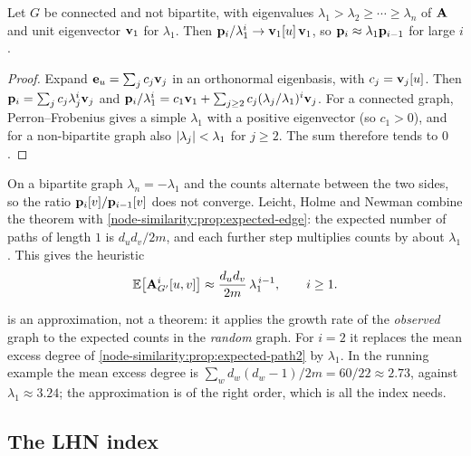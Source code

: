 \begin{notechapter}
\begin{theorem}\label{node-similarity:thm:path-growth}
Let $G$ be connected and not bipartite, with eigenvalues $\lambda_1 > \lambda_2 \ge \cdots \ge \lambda_n$ of $\mathbf{A}$ and unit eigenvector $\mathbf{v}_1$ for $\lambda_1$. Then $\mathbf{p}_i/\lambda_1^i \to \mathbf{v}_1[u]\,\mathbf{v}_1$, so $\mathbf{p}_i \approx \lambda_1\mathbf{p}_{i-1}$ for large $i$.
\end{theorem}

\begin{proof}
Expand $\mathbf{e}_u = \sum_j c_j\mathbf{v}_j$ in an orthonormal eigenbasis, with $c_j = \mathbf{v}_j[u]$. Then $\mathbf{p}_i = \sum_j c_j\lambda_j^i\mathbf{v}_j$ and $\mathbf{p}_i/\lambda_1^i = c_1\mathbf{v}_1 + \sum_{j\ge2}c_j(\lambda_j/\lambda_1)^i\mathbf{v}_j$. For a connected graph, Perron--Frobenius gives a simple $\lambda_1$ with a positive eigenvector (so $c_1 > 0$), and for a non-bipartite graph also $\left|\lambda_j\right| < \lambda_1$ for $j \ge 2$. The sum therefore tends to $0$.
\end{proof}

On a bipartite graph $\lambda_n = -\lambda_1$ and the counts alternate between the two sides, so the ratio $\mathbf{p}_i[v]/\mathbf{p}_{i-1}[v]$ does not converge. Leicht, Holme and Newman combine the theorem with \cref{node-similarity:prop:expected-edge}: the expected number of paths of length $1$ is $d_ud_v/2m$, and each further step multiplies counts by about $\lambda_1$. This gives the heuristic
\begin{equation}
\mathbb{E}\bigl[\mathbf{A}_{G'}^i[u,v]\bigr] \approx \frac{d_u d_v}{2m}\,\lambda_1^{\,i-1}, \qquad i \ge 1 .
\label{node-similarity:eq:expected-path-approx}
\end{equation}

\begin{remark}
 is an approximation, not a theorem: it applies the growth rate of the \emph{observed} graph to the expected counts in the \emph{random} graph. For $i = 2$ it replaces the mean excess degree of \cref{node-similarity:prop:expected-path2} by $\lambda_1$. In the running example the mean excess degree is $\sum_w d_w(d_w-1)/2m = 60/22 \approx 2.73$, against $\lambda_1 \approx 3.24$; the approximation is of the right order, which is all the index needs.
\end{remark}

\subsection{The LHN index}


\end{notechapter}
